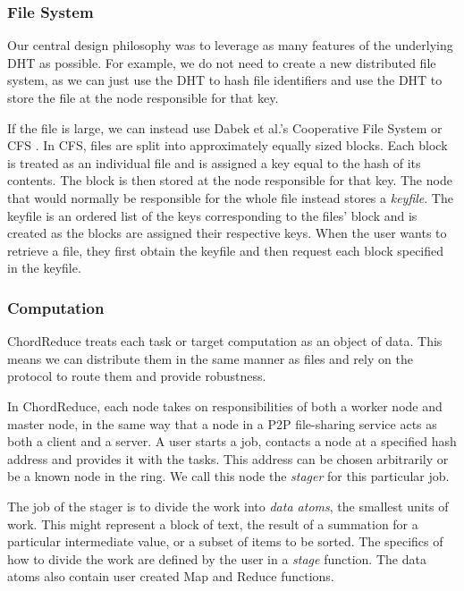 \subsubsection{File System}
Our central design philosophy was to leverage as many features of the underlying DHT as possible.  
For example, we do not need to create a new distributed file system, as we can just use the DHT to hash file identifiers and use the DHT to store the file at the node responsible for that key.

If the file is large, we can instead use Dabek et al.'s Cooperative File System or CFS \cite{CFS}.
In CFS, files are split into approximately equally sized blocks.  
Each block is treated as an individual file and is assigned a key equal to the hash of its contents.  
The block is then stored at the node responsible for that key. 
The node that would normally be responsible for the whole file instead stores a \textit{keyfile}.  
The keyfile is an ordered list of the keys corresponding to the files' block and is created as the blocks are assigned their respective keys.  
When the user wants to retrieve a file, they first obtain the keyfile and then request each block specified in the keyfile.


\subsubsection{Computation}
ChordReduce treats each task or target computation as an object of data.
This means we can distribute them in the same manner as files and rely on the protocol to route them and provide robustness.


In ChordReduce, each node takes on responsibilities of both a worker node and master node, in the same way that a node in a P2P file-sharing service acts as both a client and a server.  
A user starts a job, contacts a node at a specified hash address and provides it with the tasks.  
This address can be chosen arbitrarily or be a known node in the ring. 
We call this node the \textit{stager} for this particular job.  

The job of the stager is to divide the work into \emph{data atoms}, the smallest units of work. 
This might represent a block of text, the result of a summation for a particular intermediate value, or a subset of items to be sorted. 
The specifics of how to divide the work are defined by the user in a \emph{stage} function.  
The data atoms also contain user created Map and Reduce functions.

